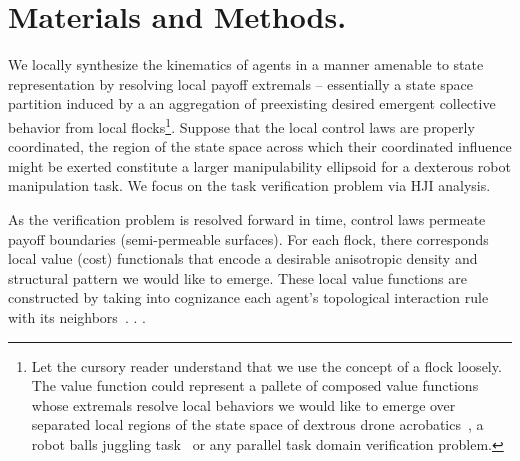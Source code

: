\section{Materials and Methods.}
\label{sec:methods}
%

%
 We locally synthesize the kinematics of agents in a manner amenable to state representation by resolving local payoff extremals -- essentially a state space partition induced by a an aggregation of preexisting desired emergent collective behavior from local flocks\footnote{Let the cursory reader understand that we use the concept of a flock loosely. The value function could represent a pallete of composed value functions whose extremals resolve local behaviors we would like to emerge over separated local regions of the state space of dextrous drone acrobatics~\cite{DeepAcrobatics}, a robot balls juggling task~\cite{SeqCompKoditschek} or any parallel task domain verification problem.}.  Suppose that the local control laws are properly coordinated, the region of the state space across which their coordinated influence might be exerted constitute a larger \eg manipulability ellipsoid for a dexterous robot manipulation task. We focus on the task verification problem via HJI analysis.
 
 As the verification problem is resolved forward in time, control laws permeate payoff boundaries (semi-permeable surfaces). For each flock, there corresponds local value (cost) functionals that encode a desirable anisotropic density and structural pattern we would like to emerge.  These local value functions are constructed by  taking into cognizance each agent's topological interaction rule with its neighbors~\cite{Ballerini1232}. . . 
 

